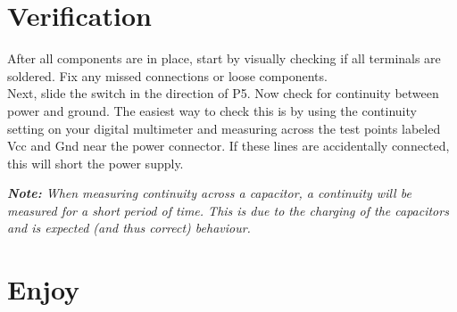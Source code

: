 \documentclass[12pt]{article}
\begin{document}
\section{Verification}
After all components are in place, start by visually checking if all terminals are soldered. Fix any missed connections or loose components. \\
\vspace{1ex}
Next, slide the switch in the direction of P5. Now check for continuity between power and ground. 
The easiest way to check this is by using the continuity setting on your digital multimeter and measuring across the test points labeled Vcc and Gnd near the power connector.
If these lines are accidentally connected, this will short the power supply.

\vspace{1ex}
\textit{\textbf{Note:} When measuring continuity across a capacitor, a continuity will be measured for a short period of time. This is due to the charging of the capacitors and is expected (and thus correct) behaviour.}





\section{Enjoy}



\clearpage
\appendix
\end{document}
